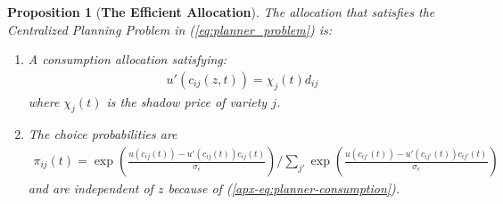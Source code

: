 \documentclass[12pt,pdftex]{article}
\newtheorem{prp}{Proposition}
\begin{document}
\begin{onehalfspacing}
\begin{prp}[\textbf{The Efficient Allocation}]\label{apx-prp:efficient-allocation} The allocation that satisfies the Centralized Planning Problem in (\ref{eq:planner_problem}) is:
\begin{enumerate}
\item A consumption allocation satisfying:
\begin{align}
u'(c_{ij}(z,t) ) = \chi_{j}(t) d_{ij}
\label{apx-eq:planner-consumption}
\end{align}
where $\chi_{j}(t)$ is the shadow price of variety $j$.
\item The choice probabilities are
\begin{align}
\pi_{ij}(t) =\exp \left( \frac{u(c_{ij}(t)) - u'(c_{ij}(t))c_{ij}(t)}{\sigma_{\epsilon}}\right) \bigg / \sum_{j'}\exp \left( \frac{u(c_{ij'}(t)) - u'(c_{ij'}(t))c_{ij'}(t)}{\sigma_{\epsilon}} \right)
\label{apx-eq:planner-choice-prob}
\end{align}
and are independent of $z$ because of (\ref{apx-eq:planner-consumption}).
\end{enumerate}
\end{prp}


\end{onehalfspacing}
\end{document}
